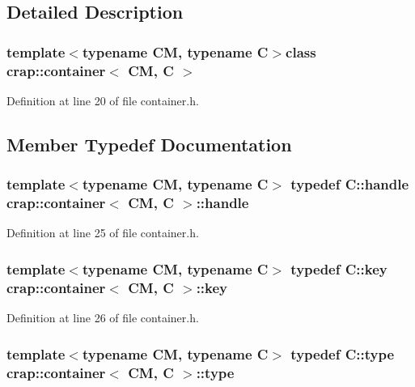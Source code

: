 \subsection{Detailed Description}
\subsubsection*{template$<$typename C\+M, typename C$>$class crap\+::container$<$ C\+M, C $>$}



Definition at line 20 of file container.\+h.



\subsection{Member Typedef Documentation}
\hypertarget{classcrap_1_1container_acc6e787516e0ca6f07b767a782a582a4}{
\subsubsection[{handle}]{\setlength{\rightskip}{0pt plus 5cm}template$<$typename C\+M, typename C$>$ typedef C\+::handle {\bf crap\+::container}$<$ C\+M, C $>$\+::{\bf handle}}}\label{classcrap_1_1container_acc6e787516e0ca6f07b767a782a582a4}


Definition at line 25 of file container.\+h.

\hypertarget{classcrap_1_1container_ab8883be30faed0c7e4ac1128376a3d74}{
\subsubsection[{key}]{\setlength{\rightskip}{0pt plus 5cm}template$<$typename C\+M, typename C$>$ typedef C\+::key {\bf crap\+::container}$<$ C\+M, C $>$\+::{\bf key}}}\label{classcrap_1_1container_ab8883be30faed0c7e4ac1128376a3d74}


Definition at line 26 of file container.\+h.

\hypertarget{classcrap_1_1container_aa6e3b5a49852a0d3efc042014345d3f1}{
\subsubsection[{type}]{\setlength{\rightskip}{0pt plus 5cm}template$<$typename C\+M, typename C$>$ typedef C\+::type {\bf crap\+::container}$<$ C\+M, C $>$\+::{\bf type}}}\label{classcrap_1_1container_aa6e3b5a49852a0d3efc042014345d3f1}


